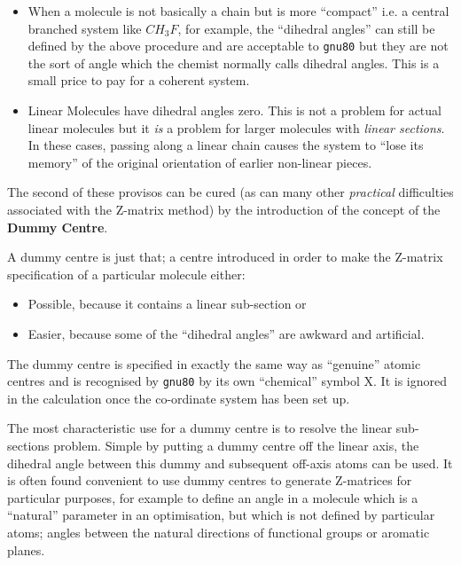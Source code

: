 \begin{itemize}
\item When a molecule is not basically a chain but is more
``compact'' i.e. a central branched system like $CH_3F$,
for example, the ``dihedral angles'' can still be defined by
the above procedure and are acceptable to {\tt gnu80} but they are not the
sort of angle which the chemist normally calls dihedral angles. This
is a small price to pay for a coherent system.
\item Linear Molecules have dihedral angles zero. This is not a problem
for actual linear molecules but it {\em is} a problem for larger
molecules with {\em linear sections}. In these cases, passing along 
a linear chain causes the system to ``lose its memory''
of the original orientation of earlier non-linear pieces.
\end{itemize}
The second of these provisos can be cured (as can many other
{\em practical} difficulties associated with the Z-matrix method)
by the introduction of the concept of the {\bf Dummy Centre}.

A dummy centre is just that; a centre introduced in order to
make the Z-matrix specification of a particular molecule either: 
\begin{itemize}
\item Possible, because it contains a linear sub-section or 
\item Easier, because some of the ``dihedral angles'' are awkward
and artificial. 
\end{itemize}
The dummy centre is specified in exactly the same way as ``genuine''
atomic centres and is recognised by {\tt gnu80} by its own ``chemical''
symbol X. It is ignored in the calculation once the co-ordinate system
has been set up.

The most characteristic use for a dummy centre is to resolve the
linear sub-sections problem. Simple by putting a dummy centre off the
linear axis, the dihedral angle between this dummy and subsequent off-axis
atoms can be used.  It is often found convenient to use dummy centres
to generate Z-matrices for particular purposes, for example to define
an angle in a molecule which is a ``natural'' parameter in
an optimisation, but which is not defined by particular atoms; angles
between the natural directions of functional groups or aromatic
planes.

